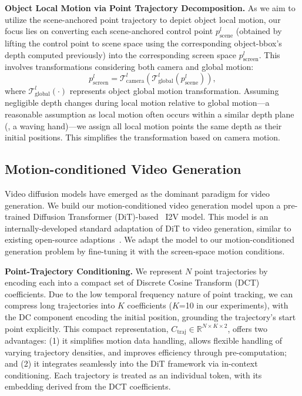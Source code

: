 \textbf{Object Local Motion via Point Trajectory Decomposition.}
As we aim to utilize the scene-anchored point trajectory to depict object local motion, our focus lies on converting each scene-anchored control point $p_\text{scene}^l$ (obtained by lifting the control point to scene space using the corresponding object-bbox's depth computed previously) into the corresponding screen space $p_\text{screen}^l$. This involves transformations considering both camera and global motion:
\begin{equation}
    p_\text{screen}^l = \mathcal{T}_\text{camera}^l(\mathcal{T}_\text{global}^l(p_\text{scene}^l)),
\end{equation}
where $\mathcal{T}_\text{global}^l(\cdot)$ represents object global motion transformation. Assuming negligible depth changes during local motion relative to global motion---a reasonable assumption as local motion often occurs within a similar depth plane (\eg, a waving hand)---we assign all local motion points the same depth as their initial positions. This simplifies the transformation based on camera motion. 


\subsection{Motion-conditioned Video Generation}
Video diffusion models have emerged as the dominant paradigm for video generation.
We build our motion-conditioned video generation model upon a pre-trained Diffusion Transformer (DiT)-based~\cite{peebles2023scalable} I2V model.
This model is an internally-developed standard adaptation of DiT to video generation, similar to existing open-source adaptions~\cite{opensora,yang2024cogvideox}.
We adapt the model to our motion-conditioned generation problem by fine-tuning it with the screen-space motion conditions.



\textbf{Point-Trajectory Conditioning.}
We represent $N$ point trajectories by encoding each into a compact set of Discrete Cosine Transform (DCT) coefficients. Due to the low temporal frequency nature of point tracking, we can compress long trajectories into $K$ coefficients ($K$=10 in our experiments), with the DC component encoding the initial position, grounding the trajectory's start point explicitly. This compact representation, $C_\text{traj}\in\mathbb{R}^{N\times K \times 2}$, offers two advantages: (1) it simplifies motion data handling, allows flexible handling of varying trajectory densities, and improves efficiency through pre-computation; and (2) it integrates seamlessly into the DiT framework via in-context conditioning. Each trajectory is treated as an individual token, with its embedding derived from the DCT coefficients.


